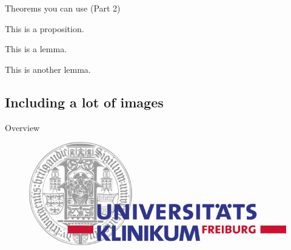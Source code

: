 \begin{frame}{Theorems you can use (Part 2)}
	\begin{proposition}[A proposition]
		This is a proposition.
	\end{proposition}
	\begin{lemma}[A lemma]
		This is a lemma.
	\end{lemma}
	\begin{lemma}
		This is another lemma.
	\end{lemma}
\end{frame}


\subsection[Include images]{Including a lot of images}

\begin{frame}{Overview}
\tableofcontents[currentsubsection]
\end{frame}


\begin{frame}[plain]
	\begin{figure}
		\centering
		\includegraphics[scale=.2]{img/logo_uniklinik-freiburg-im-breisgau.jpg}
	\end{figure}
\end{frame}


